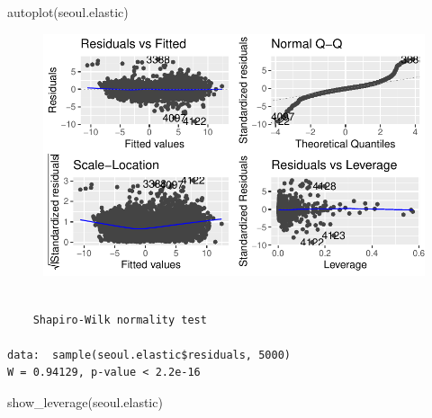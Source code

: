 \documentclass[
  letterpaper,
  DIV=11,
  numbers=noendperiod]{scrartcl}
\newenvironment{Shaded}{\begin{snugshade}}{\end{snugshade}}
\newcommand{\DecValTok}[1]{\textcolor[rgb]{0.68,0.00,0.00}{#1}}
\newcommand{\FunctionTok}[1]{\textcolor[rgb]{0.28,0.35,0.67}{#1}}
\newcommand{\NormalTok}[1]{\textcolor[rgb]{0.00,0.23,0.31}{#1}}
\newcommand{\SpecialCharTok}[1]{\textcolor[rgb]{0.37,0.37,0.37}{#1}}
\begin{document}
\begin{Shaded}
\begin{Highlighting}[]
\FunctionTok{autoplot}\NormalTok{(seoul.elastic)}
\end{Highlighting}
\end{Shaded}

\begin{figure}[H]

{\centering \includegraphics{seoul_files/figure-pdf/unnamed-chunk-12-1.pdf}

}

\end{figure}

\begin{Shaded}
\end{Shaded}

\begin{verbatim}

    Shapiro-Wilk normality test

data:  sample(seoul.elastic$residuals, 5000)
W = 0.94129, p-value < 2.2e-16
\end{verbatim}

\begin{Shaded}
\begin{Highlighting}[]
\FunctionTok{show\_leverage}\NormalTok{(seoul.elastic)}
\end{Highlighting}
\end{Shaded}
\end{document}
